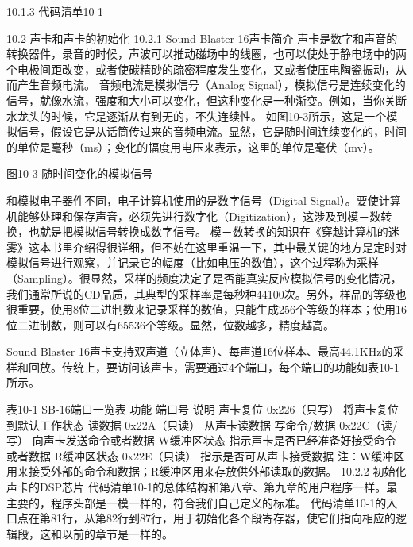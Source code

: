\documentclass[12pt]{article}
\begin{document}
\begin{CJK}{UTF8}{gbsn}
10.1.3  代码清单10-1
%
%

%

10.2  声卡和声卡的初始化
10.2.1  Sound Blaster 16声卡简介
声卡是数字和声音的转换器件，录音的时候，声波可以推动磁场中的线圈，也可以使处于静电场中的两个电极间距改变，或者使碳精砂的疏密程度发生变化，又或者使压电陶瓷振动，从而产生音频电流。
音频电流是模拟信号（Analog Signal），模拟信号是连续变化的信号，就像水流，强度和大小可以变化，但这种变化是一种渐变。例如，当你关断水龙头的时候，它是逐渐从有到无的，不失连续性。
如图10-3所示，这是一个模拟信号，假设它是从话筒传过来的音频电流。显然，它是随时间连续变化的，时间的单位是毫秒（ms）；变化的幅度用电压来表示，这里的单位是毫伏（mv）。
 
图10-3  随时间变化的模拟信号

和模拟电子器件不同，电子计算机使用的是数字信号（Digital Signal）。要使计算机能够处理和保存声音，必须先进行数字化（Digitization），这涉及到模－数转换，也就是把模拟信号转换成数字信号。
模－数转换的知识在《穿越计算机的迷雾》这本书里介绍得很详细，但不妨在这里重温一下，其中最关键的地方是定时对模拟信号进行观察，并记录它的幅度（比如电压的数值），这个过程称为采样（Sampling）。很显然，采样的频度决定了是否能真实反应模拟信号的变化情况，我们通常所说的CD品质，其典型的采样率是每秒种44100次。另外，样品的等级也很重要，使用8位二进制数来记录采样的数值，只能生成256个等级的样本；使用16位二进制数，则可以有65536个等级。显然，位数越多，精度越高。

Sound Blaster 16声卡支持双声道（立体声）、每声道16位样本、最高44.1KHz的采样和回放。传统上，要访问该声卡，需要通过4个端口，每个端口的功能如表10-1所示。

表10-1 SB-16端口一览表
功能	端口号	说明
声卡复位	0x226（只写）	将声卡复位到默认工作状态
读数据	0x22A（只读）	从声卡读数据
写命令/数据	0x22C（读/写）	向声卡发送命令或者数据
W缓冲区状态		指示声卡是否已经准备好接受命令或者数据
R缓冲区状态	0x22E（只读）	指示是否可从声卡接受数据
注：W缓冲区用来接受外部的命令和数据；R缓冲区用来存放供外部读取的数据。
10.2.2  初始化声卡的DSP芯片
代码清单10-1的总体结构和第八章、第九章的用户程序一样。最主要的，程序头部是一模一样的，符合我们自己定义的标准。
代码清单10-1的入口点在第81行，从第82行到87行，用于初始化各个段寄存器，使它们指向相应的逻辑段，这和以前的章节是一样的。


\end{CJK}
\end{document}
